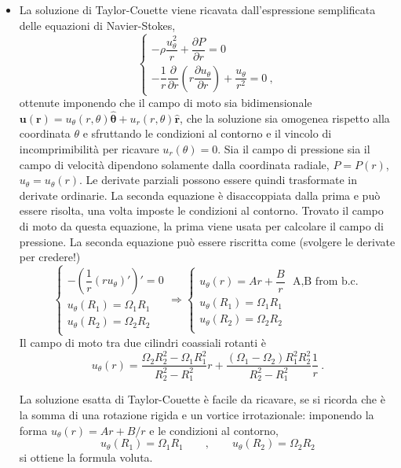 \begin{itemize}

\item La soluzione di Taylor-Couette viene ricavata dall'espressione semplificata delle equazioni di Navier-Stokes,
\begin{equation}
\begin{cases}
  -\rho \dfrac{u^2_\theta}{r} + \dfrac{\partial P}{\partial r} = 0 \\
  -\dfrac{1}{r}\dfrac{\partial}{\partial r} \left( r \dfrac{\partial u_\theta}{\partial r}  \right)  + \dfrac{u_\theta}{r^2}= 0 \ ,
\end{cases}
\end{equation}
ottenute imponendo che il campo di moto sia bidimensionale $\bm{u}(\bm{r}) = u_{\theta}(r,\theta) \bm{\hat{\theta}} + u_r (r,\theta) \bm{\hat{r}}$, che la soluzione sia omogenea rispetto alla coordinata $\theta$ e sfruttando le condizioni al contorno e il vincolo di incomprimibilità per ricavare $u_r(\theta) = 0$.
%
Sia il campo di pressione sia il campo di velocità dipendono solamente dalla coordinata radiale, $P = P(r)$, $u_\theta = u_\theta (r)$. Le derivate parziali possono essere quindi trasformate in derivate ordinarie. La seconda equazione è disaccoppiata dalla prima e può essere risolta, una volta imposte le condizioni al contorno. Trovato il campo di moto da questa equazione, la prima viene usata per calcolare il campo di pressione. La seconda equazione può essere riscritta come (svolgere le derivate per credere!)
\begin{equation}
\begin{cases}
  -\left(\dfrac{1}{r} \left(r u_\theta\right)'\right)' = 0 \\
  u_\theta(R_1) = \Omega_1 R_1 \\
  u_\theta(R_2) = \Omega_2 R_2 \\
\end{cases}
\Rightarrow
\begin{cases}
  u_\theta(r) = A r + \dfrac{B}{r} \ \ \ \text{A,B from b.c.} \\
  u_\theta(R_1) = \Omega_1 R_1 \\
  u_\theta(R_2) = \Omega_2 R_2 \\
\end{cases}
\end{equation}
%
Il campo di moto tra due cilindri coassiali rotanti è
\begin{equation}
  u_\theta(r) = \frac{\Omega_2 R_2^2 - \Omega_1 R_1^2}{R_2^2-R_1^2} r +
   \frac{(\Omega_1 - \Omega_2)R_1^2 R_2^2}{R_2^2-R_1^2}\frac{1}{r} \ .
\end{equation}
%
\begin{remark} La soluzione esatta di Taylor-Couette è facile da ricavare, se si ricorda
che è la somma di una rotazione rigida e un vortice irrotazionale: imponendo la forma
$u_\theta (r) = A r + B/r$ e le condizioni al contorno,
\begin{equation}
 u_{\theta}(R_1) = \Omega_1 R_1 \qquad , \qquad  u_{\theta}(R_2) = \Omega_2 R_2
\end{equation}
si ottiene la formula voluta.
\end{remark}


\end{itemize}
